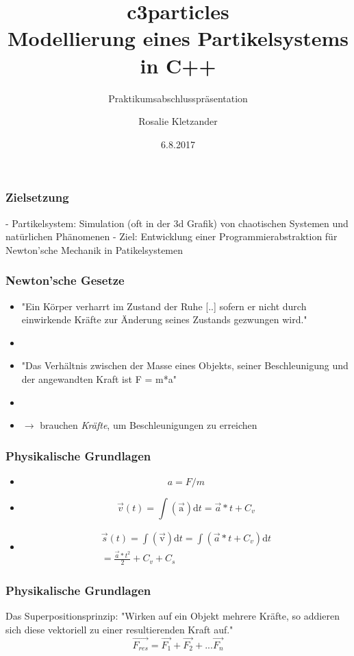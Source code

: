 \documentclass{beamer}
\title{c3particles \\ Modellierung eines Partikelsystems in C++}
\subtitle{Praktikumsabschlusspr\"asentation}
\author{Rosalie Kletzander}
\institute{Institut f\"ur Informatik, LMU M\"unchen}
\date{6.8.2017}
\begin{document}
 
\frame{\titlepage}
 
\begin{frame}
\frametitle{Zielsetzung}
- Partikelsystem: Simulation (oft in der 3d Grafik) von chaotischen Systemen und nat\"urlichen Ph\"anomenen \linebreak
\linebreak
- Ziel: Entwicklung einer Programmierabstraktion f\"ur Newton'sche Mechanik in Patikelsystemen
\end{frame}

\begin{frame}
\frametitle{Newton'sche Gesetze}
\begin{itemize}[label={}]
 \item<1-> "Ein Körper verharrt im Zustand der Ruhe [..] sofern er nicht durch einwirkende Kr\"afte zur \"Anderung seines Zustands gezwungen wird."
 \item
 \item<2-> "Das Verh\"altnis zwischen der Masse eines Objekts, seiner Beschleunigung und der angewandten Kraft ist F = m*a"
 \item
 \item<3-> $\rightarrow$ brauchen \emph{Kr\"afte}, um Beschleunigungen zu erreichen
\end{itemize}
\end{frame}

\begin{frame}
\frametitle{Physikalische Grundlagen}
\begin{itemize}[label={}]
 \item<1-> \begin{equation}
a = F/m
\end{equation}
\item<2->
\begin{equation}
\overrightarrow{v}(t) = \int \mathrm{(\overrightarrow{a})} \mathrm{d}t = \overrightarrow{a}*t + C_v
\end{equation}
 \item<3-> \begin{align}
\overrightarrow{s}(t) = \int \mathrm{(\overrightarrow{v})} \mathrm{d}t = \int (\overrightarrow{a}*t + C_v) \mathrm{d}t \\ = \frac{\overrightarrow{a}*t^2}{2} + C_v + C_s
\end{align}
\end{itemize}
\end{frame}


\begin{frame}
\frametitle{Physikalische Grundlagen}
Das Superpositionsprinzip: \linebreak
\linebreak
"Wirken auf ein Objekt mehrere Kräfte, so addieren sich diese vektoriell zu einer resultierenden Kraft auf."
\linebreak
\begin{equation}
\overrightarrow{F_{res}} = \overrightarrow{F_1} + \overrightarrow{F_2} +... \overrightarrow{F_n}
\end{equation}
\end{frame}
\end{document}
